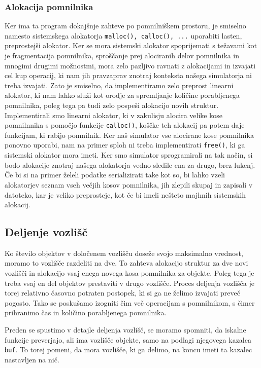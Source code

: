 \documentclass[a4paper,12pt]{article}
\begin{document}
\subsubsection{Alokacija pomnilnika}
Ker ima ta program dokajšnje zahteve po pomnilniškem prostoru, je smiselno namesto sistemskega
alokatorja \lstinline|malloc(), calloc(), ...| uporabiti lasten, preprostejši alokator.
Ker se mora sistemski alokator spoprijemati s težavami kot je fragmentacija pomnilnika, sproščanje
prej alociranih delov pomnilnika in mnogimi drugimi možnostmi, mora zelo pazljivo
ravnati z alokacijami in izvajati cel kup operacij, ki nam jih pravzaprav znotraj konteksta našega simulatorja
ni treba izvajati. Zato je smiselno, da implementiramo zelo preprost linearni alokator, ki nam lahko služi kot orodje
za spremljanje količine porabljenega pomnilnika, poleg tega pa tudi zelo pospeši alokacijo novih struktur.
Implementirali smo linearni alokator, ki v zakulisju alocira velike kose pomnilnnika s pomočjo
funkcije \lstinline|calloc()|, koščke teh alokacij pa potem daje funkcijam, ki rabijo pomnilnik.
Ker naš simulator vse alocirane kose pomnilnika ponovno uporabi, nam na primer sploh ni treba implementirati
\lstinline|free()|, ki ga sistemski alokator mora imeti. Ker smo simulator sprogramirali na tak način,
si bodo alokacije znotraj našega alokatorja vedno sledile ena za drugo, brez lukenj. Če bi si na primer želeli
podatke serializirati take kot so, bi lahko vzeli alokatorjev seznam vseh večjih kosov pomnilnika, jih zlepili
skupaj in zapisali v datoteko, kar je veliko preprosteje, kot če bi imeli nešteto majhnih sistemskih alokacij.
\subsection{Deljenje vozlišč}
Ko število objektov v določenem vozlišču doseže svojo maksimalno vrednost, moramo to vozlišče
razdeliti na dve. To zahteva alokacijo struktur za dve novi vozlišči in alokacijo vsaj enega novega
kosa pomnilnika za objekte. Poleg tega je treba vsaj en del objektov prestaviti v drugo vozlišče.
Proces deljenja vozlišča je torej relativno časovno potraten postopek, ki si ga ne želimo izvajati
preveč pogosto. Tako se poskušamo izogniti čim več operacijam s pomnilnikom, s čimer prihranimo
čas in količino porabljenega pomnilnika.

Preden se spustimo v detajle deljenja vozlišč, se moramo spomniti, da iskalne funkcije preverjajo,
ali ima vozlišče objekte, samo na podlagi njegovega kazalca \lstinline|buf|. To torej pomeni, da mora vozlišče,
ki ga delimo, na koncu imeti ta kazalec nastavljen na nič.
\end{document}
